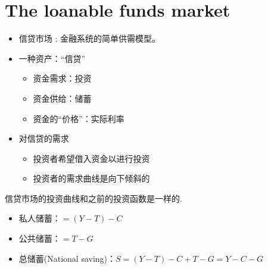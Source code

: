\newpage

\section{The loanable funds market}
\begin{itemize}
    \item 信贷市场 : 金融系统的简单供需模型。
    \item 一种资产：“信贷”
    \begin{itemize}
        \item 资金需求：投资
        \item 资金供给：储蓄
        \item 资金的“价格”：实际利率
    \end{itemize}
    \item 对信贷的需求
    \begin{itemize}
        \item 投资者希望借入资金以进行投资
        \item 投资者的需求曲线是向下倾斜的
    \end{itemize}
\end{itemize}
\begin{note}
    信贷市场的投资曲线和之前的投资函数是一样的.
\end{note}

\begin{definition}[储蓄的类型]
    \begin{itemize}
        \item 私人储蓄：$= (Y - T) - C$
        \item 公共储蓄：$= T - G$
        \item 总储蓄(National saving)：$S = (Y - T) - C + T - G = Y - C - G$
    \end{itemize}
\end{definition}

